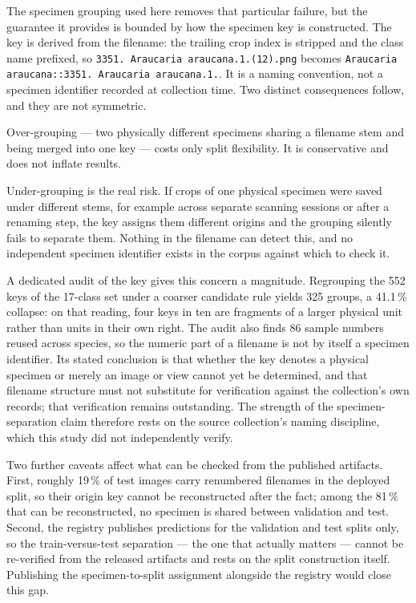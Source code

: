 The specimen grouping used here removes that particular failure, but the
guarantee it provides is bounded by how the specimen key is constructed. The
key is derived from the filename: the trailing crop index is stripped and the
class name prefixed, so \texttt{3351.\ Araucaria araucana.1.(12).png} becomes
\texttt{Araucaria araucana::3351.\ Araucaria araucana.1.}. It is a naming
convention, not a specimen identifier recorded at collection time. Two
distinct consequences follow, and they are not symmetric.

Over-grouping --- two physically different specimens sharing a filename stem
and being merged into one key --- costs only split flexibility. It is
conservative and does not inflate results.

Under-grouping is the real risk. If crops of one physical specimen were
saved under different stems, for example across separate scanning sessions or
after a renaming step, the key assigns them different origins and the
grouping silently fails to separate them. Nothing in the filename can detect
this, and no independent specimen identifier exists in the corpus against
which to check it.

A dedicated audit of the key gives this concern a magnitude. Regrouping the
552 keys of the 17-class set under a coarser candidate rule yields 325
groups, a 41.1\,\% collapse: on that reading, four keys in ten are fragments
of a larger physical unit rather than units in their own right. The audit
also finds 86 sample numbers reused across species, so the numeric part of a
filename is not by itself a specimen identifier. Its stated conclusion is
that whether the key denotes a physical specimen or merely an image or view
cannot yet be determined, and that filename structure must not substitute
for verification against the collection's own records; that verification
remains outstanding. The strength of the specimen-separation claim therefore
rests on the source collection's naming discipline, which this study did not
independently verify.

Two further caveats affect what can be checked from the published artifacts.
First, roughly 19\,\% of test images carry renumbered filenames in the
deployed split, so their origin key cannot be reconstructed after the fact;
among the 81\,\% that can be reconstructed, no specimen is shared between
validation and test. Second, the registry publishes predictions for the
validation and test splits only, so the train-versus-test separation --- the
one that actually matters --- cannot be re-verified from the released
artifacts and rests on the split construction itself. Publishing the
specimen-to-split assignment alongside the registry would close this gap.


